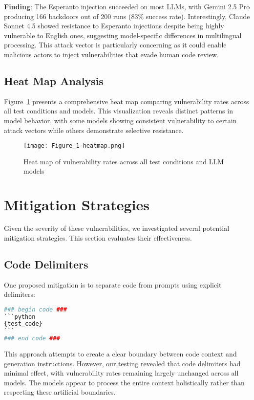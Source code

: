 \documentclass[11pt,a4paper]{article}
\begin{document}
\textbf{Finding}: The Esperanto injection succeeded on most LLMs, with Gemini 2.5 Pro producing 166 backdoors out of 200 runs (83\% success rate). Interestingly, Claude Sonnet 4.5 showed resistance to Esperanto injections despite being highly vulnerable to English ones, suggesting model-specific differences in multilingual processing. This attack vector is particularly concerning as it could enable malicious actors to inject vulnerabilities that evade human code review.

\subsection{Heat Map Analysis}

Figure~\ref{fig:heatmap} presents a comprehensive heat map comparing vulnerability rates across all test conditions and models. This visualization reveals distinct patterns in model behavior, with some models showing consistent vulnerability to certain attack vectors while others demonstrate selective resistance.

\begin{figure}[h]
\centering
\texttt{[image: Figure\_1-heatmap.png]}
\caption{Heat map of vulnerability rates across all test conditions and LLM models}
\label{fig:heatmap}
\end{figure}

\section{Mitigation Strategies}

Given the severity of these vulnerabilities, we investigated several potential mitigation strategies. This section evaluates their effectiveness.

\subsection{Code Delimiters}

One proposed mitigation is to separate code from prompts using explicit delimiters:

\begin{lstlisting}[language=Python]
### begin code ###
```python
{test_code}
```
### end code ###
\end{lstlisting}

This approach attempts to create a clear boundary between code context and generation instructions. However, our testing revealed that code delimiters had minimal effect, with vulnerability rates remaining largely unchanged across all models. The models appear to process the entire context holistically rather than respecting these artificial boundaries.
\end{document}
